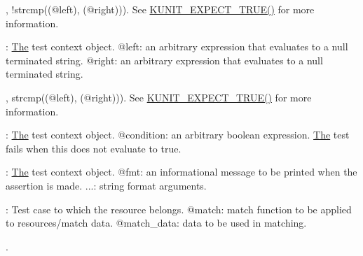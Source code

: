 \begin{DoxyRefList}
\label{test__test000047}%
%
, !strcmp((@left), (@right))). See \mbox{\hyperlink{test_8h_a0dcf3441be7037d8702d620899bf33fa}{K\+U\+N\+I\+T\+\_\+\+E\+X\+P\+E\+C\+T\+\_\+\+T\+R\+U\+E()}} for more information.  
\item[Member \mbox{\hyperlink{test_8h_a183ca5fb76b06a77cd959e212d6b01e9}{K\+U\+N\+I\+T\+\_\+\+E\+X\+P\+E\+C\+T\+\_\+\+S\+T\+R\+N\+EQ}} (test, left, right)]\label{test__test000048}%
%
\+: \mbox{\hyperlink{classThe}{The}} test context object. @left\+: an arbitrary expression that evaluates to a null terminated string. @right\+: an arbitrary expression that evaluates to a null terminated string.

\label{test__test000049}%
%
, strcmp((@left), (@right))). See \mbox{\hyperlink{test_8h_a0dcf3441be7037d8702d620899bf33fa}{K\+U\+N\+I\+T\+\_\+\+E\+X\+P\+E\+C\+T\+\_\+\+T\+R\+U\+E()}} for more information.  
\item[Member \mbox{\hyperlink{test_8h_a0dcf3441be7037d8702d620899bf33fa}{K\+U\+N\+I\+T\+\_\+\+E\+X\+P\+E\+C\+T\+\_\+\+T\+R\+UE}} (test, condition)]\label{test__test000028}%
%
\+: \mbox{\hyperlink{classThe}{The}} test context object. @condition\+: an arbitrary boolean expression. \mbox{\hyperlink{classThe}{The}} test fails when this does not evaluate to true. 
\item[Member \mbox{\hyperlink{test_8h_acd8a28cd718f950a8021518b58085fee}{K\+U\+N\+I\+T\+\_\+\+F\+A\+IL}} (test, fmt,...)]\label{test__test000027}%
%
\+: \mbox{\hyperlink{classThe}{The}} test context object. @fmt\+: an informational message to be printed when the assertion is made. ...\+: string format arguments. 
\item[Member \mbox{\hyperlink{test_8h_ab0d382da9ecb9b8a9de962b67cf2eaa1}{kunit\+\_\+find\+\_\+resource}} (struct kunit $\ast$test, kunit\+\_\+resource\+\_\+match\+\_\+t match, void $\ast$match\+\_\+data)]\label{test__test000011}%
%
\+: Test case to which the resource belongs. @match\+: match function to be applied to resources/match data. @match\+\_\+data\+: data to be used in matching.  
\item[Member \mbox{\hyperlink{test_8h_a29ab5db5a063cfaf7a5adb82151f2e0f}{kunit\+\_\+info}} (test, fmt,...)]\label{test__test000020}%
%
.


\end{DoxyRefList}
